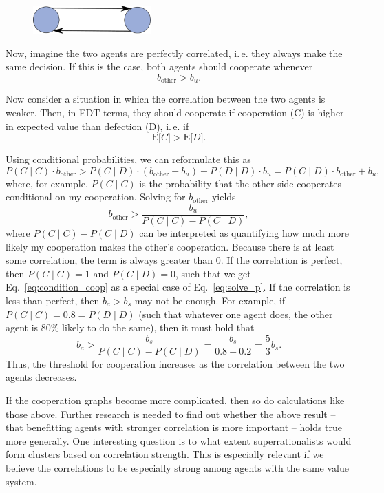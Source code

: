 \begin{figure}[h!]
    \centering
    \includegraphics[width=1.78in]{figs/mutual-cooperation-graph}
\end{figure}

Now, imagine the two agents are perfectly correlated, i.\,e. they always
make the same decision. If this is the case, both agents should
cooperate whenever
\begin{equation}
    b_{\text{other}} > b_{u}.
    \label{eq:condition_coop}
\end{equation}

Now consider a situation in which the correlation between the two agents
is weaker. Then, in EDT terms, they should cooperate if cooperation (C)
is higher in expected value than defection (D), i.\,e. if
$$
\mathrm{E}\lbrack C\rbrack > \mathrm{E}\lbrack D\rbrack.
$$

Using conditional probabilities, we can reformulate this as
$$
P(C\mid C) \cdot b_{\text{other}} > P(C\mid D) \cdot (b_{\text{other}} + b_{u}) + P(D\mid D) \cdot b_{u} =
P(C\mid D) \cdot b_{\text{other}} + b_{u},
$$
where, for example, \(P(C\mid C)\) is the probability that the other side
cooperates conditional on my cooperation. Solving for \(b_{\text{other}}\) yields
\begin{equation}
    b_{\text{other}} > \frac{b_{u}}{P(C\mid C) - P(C\mid D)},
    \label{eq:solve_p}
\end{equation}
where \(P(C\mid C) - P(C\mid D)\) can be interpreted as quantifying how much
more likely my cooperation makes the other's cooperation. Because there
is at least some correlation, the term is always greater than 0. If the
correlation is perfect, then \(P(C\mid C) = 1\) and \(P(C\mid D) = 0\), such
that we get Eq.~\eqref{eq:condition_coop} as a special case of Eq.~\eqref{eq:solve_p}. If the correlation is less
than perfect, then \(b_{a} > b_{s}\) may not be enough. For example, if
\(P(C\mid C) = 0.8 = P(D\mid D)\) (such that whatever one agent does, the other
agent is 80\% likely to do the same), then it must hold that
$$
b_{a} > \frac{b_{s}}{P(C\mid C) - P(C\mid D)} = \frac{b_{s}}{0.8 - 0.2} = \frac{5}{3}b_{s}.
$$
Thus, the threshold for cooperation increases as the correlation between
the two agents decreases.

If the cooperation graphs become more complicated, then so do
calculations like those above. Further research is needed to find out
whether the above result -- that benefitting agents with stronger
correlation is more important -- holds true more generally. One
interesting question is to what extent superrationalists would form
clusters based on correlation strength. This is especially relevant if
we believe the correlations to be especially strong among agents with
the same value system.

